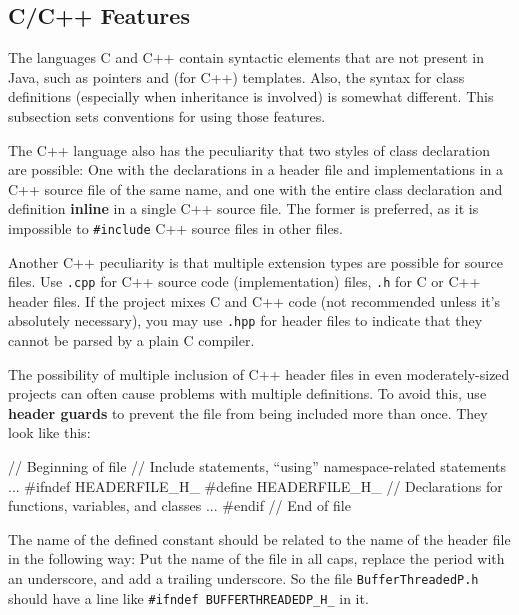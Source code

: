 \documentclass[12pt]{article}
\newcommand{\code}[1]{\texttt{#1}}
\newcommand{\textdef}[1]{\textbf{#1}}
\begin{document}
\subsection{C/C++ Features}
The languages C and C++ contain syntactic elements that are not present in Java, such as pointers and (for C++) templates. Also, the syntax for class definitions (especially when inheritance is involved) is somewhat different. This subsection sets conventions for using those features.

The C++ language also has the peculiarity that two styles of class declaration are possible: One with the declarations in a header file and implementations in a C++ source file of the same name, and one with the entire class declaration and definition \textdef{inline} in a single C++ source file. The former is preferred, as it is impossible to \code{\#include} C++ source files in other files.

Another C++ peculiarity is that multiple extension types are possible for source files. Use \code{.cpp} for C++ source code (implementation) files, \code{.h} for C or C++ header files. If the project mixes C and C++ code (not recommended unless it's absolutely necessary), you may use \code{.hpp} for header files to indicate that they cannot be parsed by a plain C compiler.

The possibility of multiple inclusion of C++ header files in even moderately-sized projects can often cause problems with multiple definitions. To avoid this, use \textdef{header guards} to prevent the file from being included more than once. They look like this:
\begin{codeex}
// Beginning of file
// Include statements, ``using'' namespace-related statements
...
#ifndef HEADERFILE_H_
#define HEADERFILE_H_
// Declarations for functions, variables, and classes
...
#endif
// End of file
\end{codeex}
The name of the defined constant should be related to the name of the header file in the following way: Put the name of the file in all caps, replace the period with an underscore, and add a trailing underscore. So the file \code{BufferThreadedP.h} should have a line like \code{\#ifndef BUFFERTHREADEDP\_H\_} in it.
\end{document}
